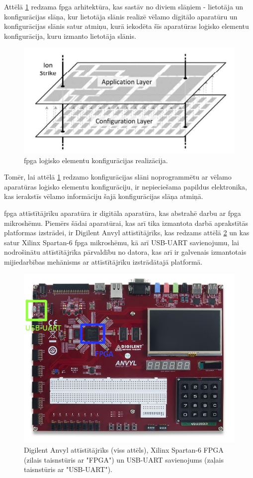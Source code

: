 Attēlā \ref{fig:fpgalayers} redzama \gls{fpga} arhitektūra, kas sastāv no diviem
slāņiem - lietotāja un konfigurācijas slāņa, kur lietotāja slānis realizē vēlamo
digitālo aparatūru un konfigurācijas slānis satur atmiņu, kurā iekodēta šīs
aparatūras loģisko elementu konfigurācija, kuru izmanto lietotāja slānis.
\cite[para. II]{HerreraAlzu2013}

\begin{figure}[H]
    \includegraphics[width=0.5\linewidth]{assets/a-c-layers.png}
    \centering
    \caption{\gls{fpga} loģisko elementu konfigurācijas realizācija.
    \cite[para. II]{HerreraAlzu2013}}
    \label{fig:fpgalayers}
\end{figure}

Tomēr, lai attēlā \ref{fig:fpgalayers} redzamo konfigurācijas slāni
noprogrammētu ar vēlamo aparatūras loģisko elementu konfigurāciju, ir
nepieciešama papildus elektronika, kas ierakstīs vēlamo informāciju šajā
konfigurācijas slāņa atmiņā.

\gls{fpga} attīstītājrīku aparatūra ir digitāla aparatūra, kas abstrahē darbu ar
\gls{fpga} mikroshēmu. Piemērs šādai aparatūrai, kas arī tika izmantota darbā
aprakstītās platformas izstrādei, ir Digilent Anvyl attīstītājrīks, kas redzams
attēlā \ref{fig:anvylexplained} un kas satur Xilinx Spartan-6 \gls{fpga}
mikroshēmu, kā arī USB-UART savienojumu, lai nodrošinātu attīstītājrīka
pārvaldību no datora, kas arī ir galvenais izmantotais mijiedarbības mehānisms
ar attīstītājrīku izstrādātajā platformā.

\begin{figure}[H]
    \includegraphics[width=0.7\linewidth]{assets/anvyl-explained.png}
    \centering
    \caption{Digilent Anvyl attīstītājrīks (viss attēls), Xilinx Spartan-6 FPGA (zilais taisnstūris ar "FPGA")
        un USB-UART savienojums (zaļais taisnstūris ar "USB-UART").}
    \label{fig:anvylexplained}
\end{figure}

